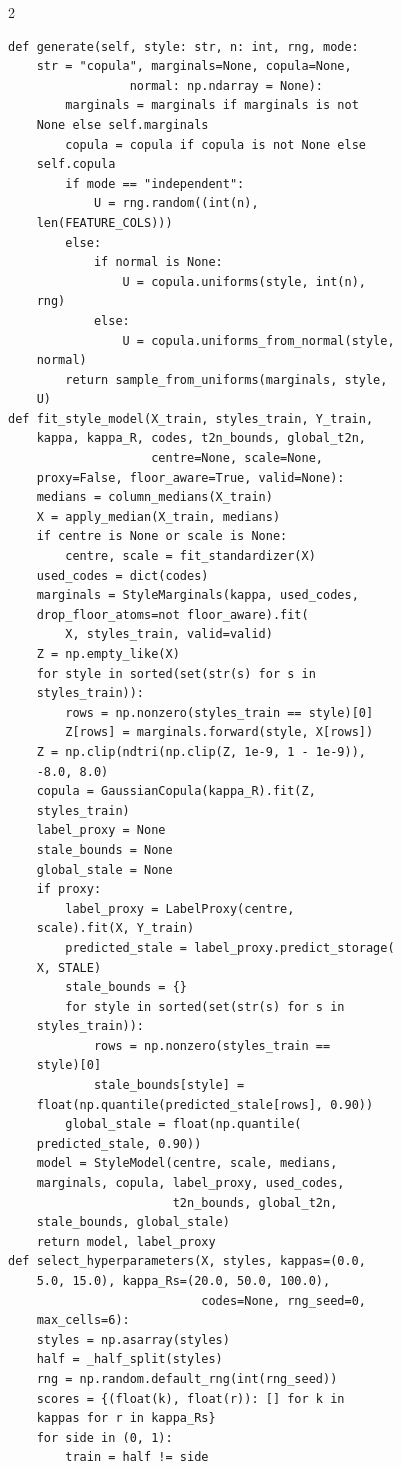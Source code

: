 \begin{multicols}{2}
\begin{Verbatim}[fontsize=\scriptsize]
    def generate(self, style: str, n: int, rng, mode:
    str = "copula", marginals=None, copula=None,
                 normal: np.ndarray = None):
        marginals = marginals if marginals is not
    None else self.marginals
        copula = copula if copula is not None else
    self.copula
        if mode == "independent":
            U = rng.random((int(n),
    len(FEATURE_COLS)))
        else:
            if normal is None:
                U = copula.uniforms(style, int(n),
    rng)
            else:
                U = copula.uniforms_from_normal(style,
    normal)
        return sample_from_uniforms(marginals, style,
    U)
def fit_style_model(X_train, styles_train, Y_train,
    kappa, kappa_R, codes, t2n_bounds, global_t2n,
                    centre=None, scale=None,
    proxy=False, floor_aware=True, valid=None):
    medians = column_medians(X_train)
    X = apply_median(X_train, medians)
    if centre is None or scale is None:
        centre, scale = fit_standardizer(X)
    used_codes = dict(codes)
    marginals = StyleMarginals(kappa, used_codes,
    drop_floor_atoms=not floor_aware).fit(
        X, styles_train, valid=valid)
    Z = np.empty_like(X)
    for style in sorted(set(str(s) for s in
    styles_train)):
        rows = np.nonzero(styles_train == style)[0]
        Z[rows] = marginals.forward(style, X[rows])
    Z = np.clip(ndtri(np.clip(Z, 1e-9, 1 - 1e-9)),
    -8.0, 8.0)
    copula = GaussianCopula(kappa_R).fit(Z,
    styles_train)
    label_proxy = None
    stale_bounds = None
    global_stale = None
    if proxy:
        label_proxy = LabelProxy(centre,
    scale).fit(X, Y_train)
        predicted_stale = label_proxy.predict_storage(
    X, STALE)
        stale_bounds = {}
        for style in sorted(set(str(s) for s in
    styles_train)):
            rows = np.nonzero(styles_train ==
    style)[0]
            stale_bounds[style] =
    float(np.quantile(predicted_stale[rows], 0.90))
        global_stale = float(np.quantile(
    predicted_stale, 0.90))
    model = StyleModel(centre, scale, medians,
    marginals, copula, label_proxy, used_codes,
                       t2n_bounds, global_t2n,
    stale_bounds, global_stale)
    return model, label_proxy
def select_hyperparameters(X, styles, kappas=(0.0,
    5.0, 15.0), kappa_Rs=(20.0, 50.0, 100.0),
                           codes=None, rng_seed=0,
    max_cells=6):
    styles = np.asarray(styles)
    half = _half_split(styles)
    rng = np.random.default_rng(int(rng_seed))
    scores = {(float(k), float(r)): [] for k in
    kappas for r in kappa_Rs}
    for side in (0, 1):
        train = half != side

\end{Verbatim}
\end{multicols}
